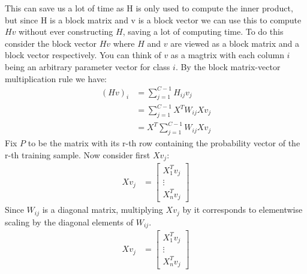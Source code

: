 \documentclass[12pt]{article}
\begin{document}
This can save us a lot of time as H is only used to compute the inner product,
but since H is a block matrix and v is a block vector we can use this to compute $Hv$
without ever constructing $H$, saving a lot of computing time. To do this consider
the block vector $Hv$ where $H$ and $v$ are viewed as a block matrix and a block vector
respectively. You can think of $v$ as a magtrix with each column $i$ being an arbitrary 
parameter vector for class $i$. By the block matrix-vector multiplication rule we have:
\begin{align*}
    (Hv)_i &= \displaystyle \sum_{j = 1}^{C-1} H_{ij}v_j \\
    &= \sum_{j = 1}^{C-1} X^TW_{ij}Xv_j \\
    &= X^T\sum_{j = 1}^{C-1} W_{ij}Xv_j
\end{align*}
Fix $P$ to be the matrix with its r-th row containing the probability vector
of the r-th training sample. Now consider first $Xv_j$:
\begin{align*}
    Xv_j &= \begin{bmatrix}
        X_1^Tv_j \\ \vdots \\ X_n^Tv_j
    \end{bmatrix}
\end{align*}
Since $W_{ij}$ is a diagonal matrix, multiplying $Xv_j$ by it corresponds to
elementwise scaling by the diagonal elements of $W_{ij}$.
\begin{align*}
    Xv_j &= \begin{bmatrix}
        X_1^Tv_j \\ \vdots \\ X_n^Tv_j
    \end{bmatrix}
\end{align*}
\end{document}
